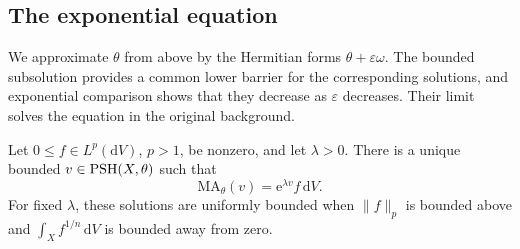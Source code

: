 \subsection{The exponential equation}

We approximate $\theta$ from above by the Hermitian forms $\theta+\varepsilon\omega$. The bounded subsolution provides a common lower barrier for the corresponding solutions, and exponential comparison shows that they decrease as $\varepsilon$ decreases. Their limit solves the equation in the original background.

\begin{theorem}\label{thm:big-bounded-exponential}
Let $0\leq f\in L^p(\mathrm{d}V)$, $p>1$, be nonzero, and let $\lambda>0$. There is a unique bounded $v\in\mathrm{PSH}(X,\theta)$ such that
\[
 \mathrm{MA}_\theta(v)=\mathrm{e}^{\lambda v}f\,\mathrm{d}V.
\]
For fixed $\lambda$, these solutions are uniformly bounded when $\|f\|_p$ is bounded above and $\int_X f^{1/n}\,\mathrm{d}V$ is bounded away from zero.
\end{theorem}
